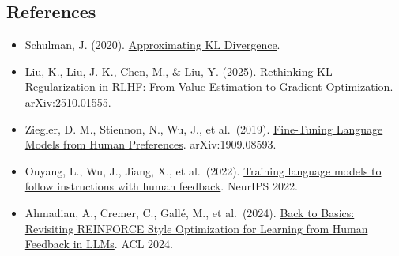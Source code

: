\FloatBarrier
{}
\hypertarget{references-86}{%
\subsection{References}\label{references-86}}

\vspace{0.25em}
\begin{itemize}
\tightlist
\item
  Schulman, J. (2020). \href{http://joschu.net/blog/kl-approx.html}{Approximating KL Divergence}.
\item
  Liu, K., Liu, J. K., Chen, M., \& Liu, Y. (2025). \href{https://arxiv.org/abs/2510.01555}{Rethinking KL Regularization in RLHF: From Value Estimation to Gradient Optimization}. arXiv:2510.01555.
\item
  Ziegler, D. M., Stiennon, N., Wu, J., et al.~(2019). \href{https://arxiv.org/abs/1909.08593}{Fine-Tuning Language Models from Human Preferences}. arXiv:1909.08593.
\item
  Ouyang, L., Wu, J., Jiang, X., et al.~(2022). \href{https://arxiv.org/abs/2203.02155}{Training language models to follow instructions with human feedback}. NeurIPS 2022.
\item
  Ahmadian, A., Cremer, C., Gallé, M., et al.~(2024). \href{https://arxiv.org/abs/2402.14740}{Back to Basics: Revisiting REINFORCE Style Optimization for Learning from Human Feedback in LLMs}. ACL 2024.
\end{itemize}

\clearpage
